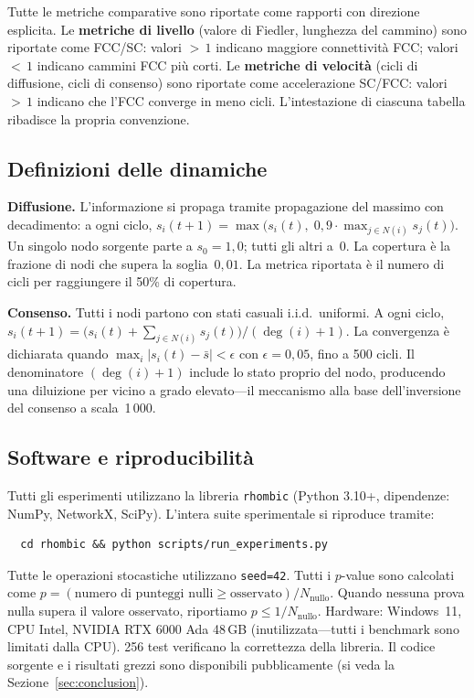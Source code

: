 \documentclass[11pt]{article}
\begin{document}
Tutte le metriche comparative sono riportate come rapporti con direzione
esplicita. Le \textbf{metriche di livello} (valore di Fiedler, lunghezza
del cammino) sono riportate come FCC/SC: valori ${>}\,1$ indicano
maggiore connettivit\`a FCC; valori ${<}\,1$ indicano cammini FCC pi\`u
corti. Le \textbf{metriche di velocit\`a} (cicli di diffusione, cicli di
consenso) sono riportate come accelerazione SC/FCC: valori ${>}\,1$
indicano che l'FCC converge in meno cicli. L'intestazione di ciascuna
tabella ribadisce la propria convenzione.

\subsection{Definizioni delle dinamiche}

\textbf{Diffusione.} L'informazione si propaga tramite propagazione del
massimo con decadimento: a ogni ciclo,
$s_i(t{+}1) = \max\bigl(s_i(t),\; 0{,}9 \cdot \max_{j \in N(i)} s_j(t)\bigr)$.
Un singolo nodo sorgente parte a $s_0 = 1{,}0$; tutti gli altri a~$0$.
La copertura \`e la frazione di nodi che supera la soglia~$0{,}01$.
La metrica riportata \`e il numero di cicli per raggiungere il 50\%
di copertura.

\textbf{Consenso.} Tutti i nodi partono con stati casuali i.i.d.\
uniformi. A ogni ciclo,
$s_i(t{+}1) = \bigl(s_i(t) + \sum_{j \in N(i)} s_j(t)\bigr) / (\deg(i) + 1)$.
La convergenza \`e dichiarata quando
$\max_i |s_i(t) - \bar{s}| < \epsilon$ con $\epsilon = 0{,}05$,
fino a 500 cicli. Il denominatore $(\deg(i) + 1)$ include lo stato
proprio del nodo, producendo una diluizione per vicino a grado
elevato---il meccanismo alla base dell'inversione del consenso a
scala~1\,000.

\subsection{Software e riproducibilit\`a}

Tutti gli esperimenti utilizzano la libreria \texttt{rhombic}
(Python 3.10+, dipendenze: NumPy, NetworkX, SciPy). L'intera suite
sperimentale si riproduce tramite:
\begin{verbatim}
  cd rhombic && python scripts/run_experiments.py
\end{verbatim}
Tutte le operazioni stocastiche utilizzano \texttt{seed=42}. Tutti i
$p$-value sono calcolati come $p = (\text{numero di punteggi nulli} \geq
\text{osservato}) / N_{\text{nullo}}$. Quando nessuna prova nulla
supera il valore osservato, riportiamo $p \leq 1/N_{\text{nullo}}$.
Hardware: Windows~11, CPU Intel, NVIDIA RTX 6000 Ada 48\,GB
(inutilizzata---tutti i benchmark sono limitati dalla CPU). 256 test
verificano la correttezza della libreria. Il codice sorgente e i
risultati grezzi sono disponibili pubblicamente (si veda la
Sezione~\ref{sec:conclusion}).
\end{document}
